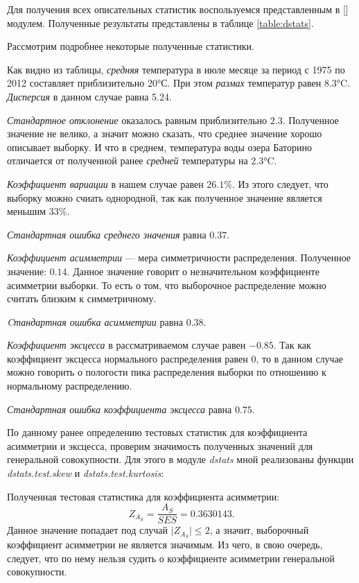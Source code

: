 Для получения всех описательных статистик воспользуемся представленным в [] модулем. Полученные результаты представлены в таблице \ref{table:dstats}.



Рассмотрим подробнее некоторые полученные статистики.

Как видно из таблицы, \textit{средняя} температура в июле месяце за период с 1975 по 2012 составляет приблизительно 20°С. При этом \textit{размах} температур равен 8.3°C. \textit{Дисперсия} в данном случае равна 5.24.

\textit{Стандартное отклонение} оказалось равным приблизительно $2.3$. Полученное значение не велико, а значит можно сказать, что среднее значение хорошо описывает выборку. И что в среднем, температура воды озера Баторино отличается от полученной ранее \textit{средней} температуры на 2.3°C.

\textit{Коэффициент вариации} в нашем случае равен $26.1\%$. Из этого следует, что выборку можно счиать однородной, так как полученное значение является меньшим 33\%.

\textit{Стандартная ошибка среднего значения} равна $0.37$.

\textit{Коэффициент асимметрии} --- мера симметричности распределения. Полученное значение: $0.14$. Данное значение говорит о незначительном коэффициенте асимметрии выборки. То есть о том, что выборочное распределение можно считать близким к симметричному.

\textit{Cтандартная ошибка асимметрии} равна $0.38$.

\textit{Коэффициент эксцесса} в рассматриваемом случае равен $-0.85$. Так как коэффициент эксцесса нормального распределения равен $0$, то в данном случае можно говорить о пологости пика распределения выборки по отношению к нормальному распределению. 

\textit{Стандартная ошибка коэффициента эксцесса} равна $0.75$. 

По данному ранее определению тестовых статистик для коэффициента асимметрии и эксцесса, проверим значимость полученных значений для генеральной совокупности. Для этого в модуле \textit{dstats} мной реализованы функции \textit{dstats.test.skew} и \textit{dstats.test.kurtosis}:

Полученная тестовая статистика для коэффициента асимметрии:
\begin{equation*}
	Z_{A_S} = \frac{A_S}{SES} = 0.3630143.
\end{equation*}
Данное значение попадает под случай $\vert Z_{A_S} \vert \le 2$, а значит, выборочный коэффициент асимметрии не является значимым. Из чего, в свою очередь, следует, что по нему нельзя судить о коэффициенте асимметрии генеральной совокупности.

